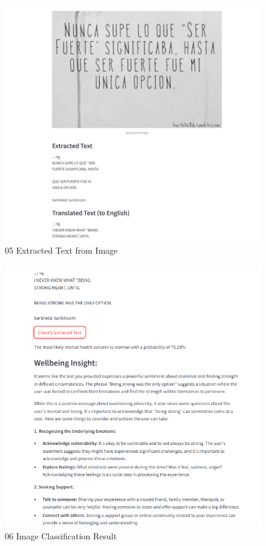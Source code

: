 \begin{figure}[h!]  
    \centering
    \includegraphics[width=1.0\textwidth]{App Images/05 Interface.png}  
    \caption{05 Extracted Text from Image}
    \label{05i}  %
\end{figure}

\begin{figure}[h!]  
    \centering
    \includegraphics[width=1.0\textwidth]{App Images/06 Interface.png}  
    \caption{06 Image Classification Result}
    \label{06i}  %
\end{figure}

